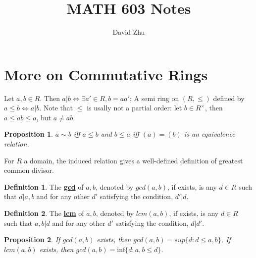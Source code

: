 \documentclass{article}
\title{MATH 603 Notes}
\author{David Zhu}
\newtheorem{proposition}{Proposition}[section]
\theoremstyle{definition}
\newtheorem{definition}{Definition}[section]
\theoremstyle{definition}
\begin{document}
\maketitle

\section{More on Commutative Rings}
Let $a,b\in R$. Then $a|b \iff \exists a'\in R, b=aa'$;
A semi ring on $(R,\leq)$ defined by $a\leq b \iff a|b$. Note that $\leq $ is usally not a partial order: let $b\in R^{\times}$, then $a\leq ab\leq a$, but $a\neq ab$.


\begin{tcolorbox}[colback=blue!5!white,colframe=blue!30!white]
\begin{proposition}
    $a\sim b$ iff $a\leq b$ and $b\leq a$ iff $(a)=(b)$ is an equivalence relation.
\end{proposition}
\end{tcolorbox}

For $R$ a domain, the induced relation gives a well-defined definition of greatest common divisor.
\begin{tcolorbox}[colback=red!5!white,colframe=red!30!white]
    \begin{definition}
        The \underline{\textbf{gcd}} of $a,b$, denoted by $gcd(a,b)$, if exists, is any $d\in R$ such that $d|a,b$ and for any other $d'$ satisfying the condition, $d'|d$.
    \end{definition}    
\end{tcolorbox}


\begin{tcolorbox}[colback=purple!5!white,colframe=purple!75!black]
\begin{definition}
    The \underline{\textbf{lcm}} of $a,b$, denoted by $lcm(a,b)$, if exists, is any  $d\in R$ such that $a,b|d$ and for any other $d'$ satisfying the condition, $d|d'$.
\end{definition}
\end{tcolorbox}


\begin{tcolorbox}[colback=blue!5!white,colframe=blue!30!white]
\begin{proposition}
    If $gcd(a,b)$ exists, then $gcd(a,b)=sup \{ d:d\leq a,b \}$.  If $lcm(a,b)$ exists, then $gcd(a,b)=\textrm{inf} \{ d :a,b\leq d \}$. 
\end{proposition}
\end{tcolorbox}
\end{document}
